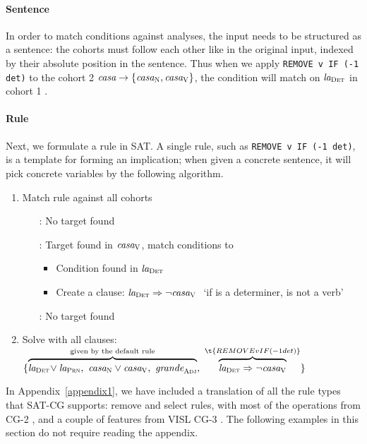 \paragraph{Sentence}
In order to match conditions against analyses, the input needs to be
structured as a sentence: the cohorts must follow each other like in
the original input, indexed by their absolute position in the
sentence. Thus when we apply \texttt{REMOVE v IF (-1 det)} to the
cohort 2 $\text{\em casa}{} \rightarrow \{\text{\em casa}_{\text{\sc N}} , \text{\em casa}_{\text{\sc V}}\}$, the condition will match on
$\text{\em la}_{\text{\sc Det}}$ in cohort 1 \la.

\paragraph{Rule}

Next, we formulate a rule in SAT. A single rule, such as \texttt{REMOVE v IF (-1 det)}, is a template for forming an implication; when given a concrete sentence, it will pick concrete variables by the following algorithm.

\begin{enumerate}
\item Match rule against all cohorts
 \begin{itemize}
    \item[\la:] No target found
    \item[\casa:] Target found in $\text{\em casa}_{\text{\sc V}}$, match conditions to \la
      \begin{itemize}
       \item Condition found in $\text{\em la}_{\text{\sc Det}}$
       \item Create a clause: $\text{\em la}_{\text{\sc Det}} \Rightarrow \neg \text{\em casa}_{\text{\sc V}} \ $ `if \la{} is a determiner, \casa{} is not a verb'
      \end{itemize}
    \item[\grande:] No target found
  \end{itemize}
\item Solve with all clauses: 
  $\{ \ob{\laDet \! \vee \laPrn, \ \casaN \vee \casaV, \  \grandeAdj}^{\text{given by the default rule}}, \ 
      \ob{\laDet \Rightarrow \neg \casaV}^{\t{REMOVE v IF (-1 det)}} \}$
\end{enumerate}

\noindent In Appendix~\ref{appendix1}, we have included a translation
of all the rule types that SAT-CG supports: {\sc remove} and {\sc
  select} rules, with most of the operations from CG-2
\cite{tapanainen1996}, and a couple of features from VISL CG-3
\cite{vislcg3}. The following examples in this section do not require
reading the appendix.

